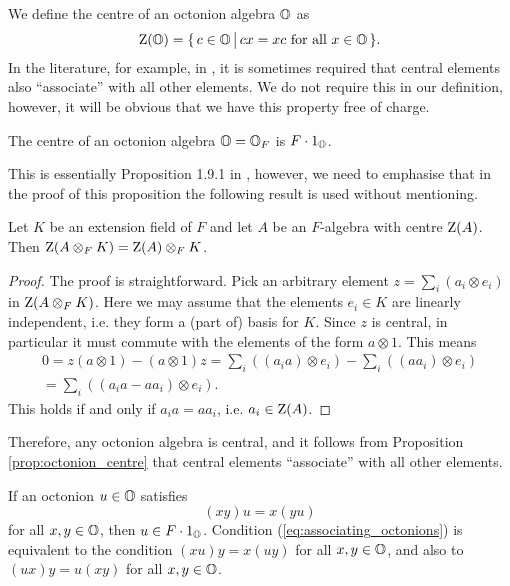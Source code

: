 We define the centre of an octonion algebra $\mathbb{O}$ as
\begin{equation}
	\label{eq:octonion_centre}
	\mathord{\mathrm{Z}}(\mathbb{O}) = \{\,c \in \mathbb{O}\,\big|\, cx = xc\ \mbox{for all}\ x \in \mathbb{O}\,\}.
\end{equation}
In the literature, for example, in \cite{Schafer}, it is sometimes required that central 
elements also ``associate'' with all other elements. We do not require this in our definition,
however, it will be obvious that we have this property free of charge. 

\begin{proposition}
	\label{prop:octonion_centre}
	The centre of an octonion algebra $\mathbb{O}=\mathbb{O}_F$ is $F\cdot 1_{\mathbb{O}}$.  
\end{proposition}

This is essentially Proposition 1.9.1 in \cite{SpringerVeldkamp}, however, we need to emphasise
that in the proof of this proposition the following result is used without mentioning.

\begin{lemma}
	Let $K$ be an extension field of $F$ and let $A$ be an $F$-algebra with centre $\mathord{\mathrm{Z}}(A)$.
	Then $\mathord{\mathrm{Z}}(A\otimes_F K) = \mathord{\mathrm{Z}}(A)\otimes_F K$. 
\end{lemma}

\begin{proof}
	The proof is straightforward. Pick an arbitrary element $z = \sum_i (a_i \otimes e_i)$ in
	$\mathord{\mathrm{Z}}(A\otimes_F K)$. Here we may assume that the elements $e_i \in K$ are linearly 
	independent, i.e. they form a (part of) basis for $K$. Since $z$ is central, in particular it 
	must commute with the elements of the form $a \otimes 1$. This means
	\begin{align*}
		0 = z (a \otimes 1) - (a\otimes 1) z = \sum_i ( (a_i a) \otimes e_i )
			- \sum_i( (a a_i) \otimes e_i ) \\
		= \sum_i ( (a_i a - a a_i) \otimes e_i ). 
	\end{align*}
	This holds if and only if $a_i a = a a_i$, i.e. $a_i \in \mathord{\mathrm{Z}}(A)$. 
\end{proof}

Therefore, any octonion algebra is central, and it follows from Proposition 
\ref{prop:octonion_centre} that central elements
``associate'' with all other elements.

\begin{proposition}
	\label{prop:associating_elements}
	If an octonion $u \in \mathbb{O}$ satisfies
	\begin{equation}
		\label{eq:associating_octonions}
		(xy)u = x(yu)
	\end{equation}
	for all $x,y \in \mathbb{O}$, then $u \in F\cdot 1_{\mathbb{O}}$. Condition (\ref{eq:associating_octonions})
	is equivalent to the condition $(xu)y = x(uy)$ for all $x,y \in \mathbb{O}$, and also to
	$(ux)y = u(xy)$ for all $x,y \in \mathbb{O}$. 
\end{proposition}

